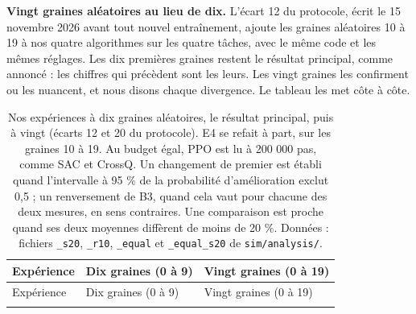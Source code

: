 \documentclass[11pt,a4paper]{article}
\begin{document}
\textbf{Vingt graines aléatoires au lieu de dix.} L'écart 12 du
protocole, écrit le 15 novembre 2026 avant tout nouvel entraînement,
ajoute les graines aléatoires 10 à 19 à nos quatre algorithmes sur les
quatre tâches, avec le même code et les mêmes réglages. Les dix
premières graines restent le résultat principal, comme annoncé : les
chiffres qui précèdent sont les leurs. Les vingt graines les confirment
ou les nuancent, et nous disons chaque divergence. Le tableau les met
côte à côte.

\begin{longtable}[]{@{}
  >{\raggedright\arraybackslash}p{}
  >{\raggedright\arraybackslash}p{}
  >{\raggedright\arraybackslash}p{}@{}}
\caption{Nos expériences à dix graines aléatoires, le résultat
principal, puis à vingt (écarts 12 et 20 du protocole). E4 se refait à
part, sur les graines 10 à 19. Au budget égal, PPO est lu à 200 000 pas,
comme SAC et CrossQ. Un changement de premier est établi quand
l'intervalle à 95 \% de la probabilité d'amélioration exclut 0,5 ; un
renversement de B3, quand cela vaut pour chacune des deux mesures, en
sens contraires. Une comparaison est proche quand ses deux moyennes
diffèrent de moins de 20 \%. Données : fichiers \texttt{\_s20},
\texttt{\_r10}, \texttt{\_equal} et \texttt{\_equal\_s20} de
\texttt{sim/analysis/}.}\tabularnewline
\toprule\noalign{}
\begin{minipage}[b]{\linewidth}\raggedright
Expérience
\end{minipage} & \begin{minipage}[b]{\linewidth}\raggedright
Dix graines (0 à 9)
\end{minipage} & \begin{minipage}[b]{\linewidth}\raggedright
Vingt graines (0 à 19)
\end{minipage} \\
\midrule\noalign{}
\endfirsthead
\toprule\noalign{}
\begin{minipage}[b]{\linewidth}\raggedright
Expérience
\end{minipage} & \begin{minipage}[b]{\linewidth}\raggedright
Dix graines (0 à 9)
\end{minipage} & \begin{minipage}[b]{\linewidth}\raggedright
Vingt graines (0 à 19)
\end{minipage} \\
\midrule\noalign{}

\end{longtable}
\end{document}
